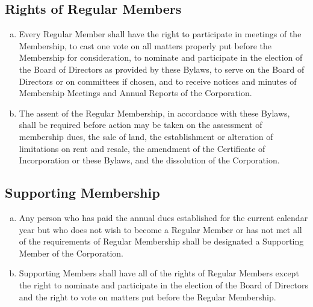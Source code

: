 \subsection{Rights of Regular Members}
\begin{enumerate}[a.]
\item Every Regular Member shall have the right to participate in
  meetings of the Membership, to cast one vote on all matters properly
  put before the Membership for consideration, to nominate and
  participate in the election of the Board of Directors as provided by
  these Bylaws, to serve on the Board of Directors or on committees if
  chosen, and to receive notices and minutes of Membership Meetings
  and Annual Reports of the Corporation.
\item The assent of the Regular Membership, in accordance with these
  Bylaws, shall be required before action may be taken on the
  assessment of membership dues, the sale of land, the establishment
  or alteration of limitations on rent and resale, the amendment of
  the Certificate of Incorporation or these Bylaws, and the
  dissolution of the Corporation.
\end{enumerate}
  
\subsection{Supporting Membership}
\begin{enumerate}[a.]
\item Any person who has paid the annual dues established for the
  current calendar year but who does not wish to become a Regular
  Member or has not met all of the requirements of Regular Membership
  shall be designated a Supporting Member of the Corporation.
\item Supporting Members shall have all of the rights of Regular
  Members except the right to nominate and participate in the election
  of the Board of Directors and the right to vote on matters put
  before the Regular Membership.
\end{enumerate}

